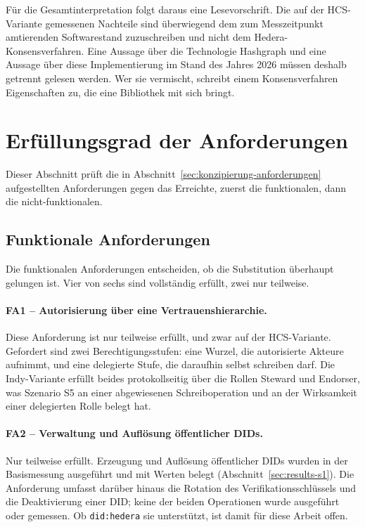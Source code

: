 Für die Gesamtinterpretation folgt daraus eine Lesevorschrift. Die auf der HCS-Variante gemessenen Nachteile sind überwiegend dem zum Messzeitpunkt amtierenden Softwarestand zuzuschreiben und nicht dem Hedera-Konsensverfahren. Eine Aussage über die Technologie Hashgraph und eine Aussage über diese Implementierung im Stand des Jahres 2026 müssen deshalb getrennt gelesen werden. Wer sie vermischt, schreibt einem Konsensverfahren Eigenschaften zu, die eine Bibliothek mit sich bringt.

\section{Erfüllungsgrad der Anforderungen}
\label{sec:results-nfa}

Dieser Abschnitt prüft die in Abschnitt~\ref{sec:konzipierung-anforderungen} aufgestellten Anforderungen gegen das Erreichte, zuerst die funktionalen, dann die nicht-funktionalen.

\subsection{Funktionale Anforderungen}
\label{subsec:results-fa}

Die funktionalen Anforderungen entscheiden, ob die Substitution überhaupt gelungen ist. Vier von sechs sind vollständig erfüllt, zwei nur teilweise.

\paragraph{FA1 -- Autorisierung über eine Vertrauenshierarchie.} Diese Anforderung ist nur teilweise erfüllt, und zwar auf der HCS-Variante. Gefordert sind zwei Berechtigungsstufen: eine Wurzel, die autorisierte Akteure aufnimmt, und eine delegierte Stufe, die daraufhin selbst schreiben darf. Die Indy-Variante erfüllt beides protokollseitig über die Rollen Steward und Endorser, was Szenario S5 an einer abgewiesenen Schreiboperation und an der Wirksamkeit einer delegierten Rolle belegt hat.

\paragraph{FA2 -- Verwaltung und Auflösung öffentlicher DIDs.} Nur teilweise erfüllt. Erzeugung und Auflösung öffentlicher DIDs wurden in der Basismessung ausgeführt und mit Werten belegt (Abschnitt~\ref{sec:results-s1}). Die Anforderung umfasst darüber hinaus die Rotation des Verifikationsschlüssels und die Deaktivierung einer DID; keine der beiden Operationen wurde ausgeführt oder gemessen. Ob \texttt{did:hedera} sie unterstützt, ist damit für diese Arbeit offen.

